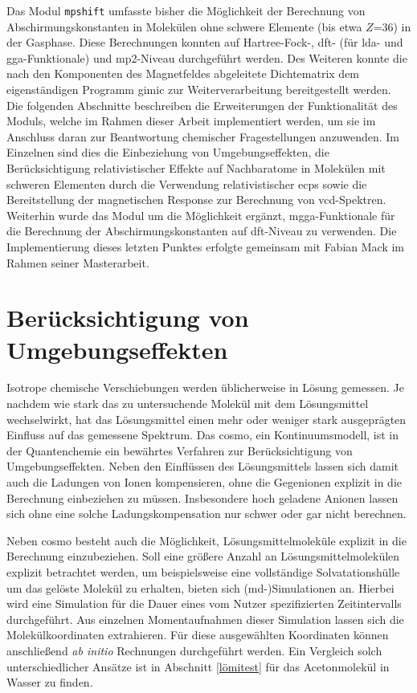 Das Modul \texttt{mpshift} umfasste bisher die Möglichkeit der Berechnung von Abschirmungskonstanten in Molekülen ohne schwere Elemente (bis etwa $Z$=36) in der Gasphase. Diese Berechnungen konnten auf Hartree-Fock-, \ac{dft}- (für \ac{lda}- und \ac{gga}-Funktionale) und \ac{mp2}-Niveau durchgeführt werden. Des Weiteren konnte die nach den Komponenten des Magnetfeldes abgeleitete Dichtematrix dem eigenständigen Programm \ac{gimic} zur Weiterverarbeitung bereitgestellt werden. Die folgenden Abschnitte beschreiben die Erweiterungen der Funktionalität des Moduls, welche im Rahmen dieser Arbeit implementiert werden, um sie im Anschluss daran zur Beantwortung chemischer Fragestellungen anzuwenden. Im Einzelnen sind dies die Einbeziehung von Umgebungseffekten, die Berücksichtigung relativistischer Effekte auf Nachbaratome in Molekülen mit schweren Elementen durch die Verwendung relativistischer \acp{ecp} sowie die Bereitstellung der magnetischen Response zur Berechnung von \ac{vcd}-Spektren. Weiterhin wurde das Modul um die Möglichkeit ergänzt, \ac{mgga}-Funktionale für die Berechnung der Abschirmungskonstanten auf \ac{dft}-Niveau zu verwenden. Die Implementierung dieses letzten Punktes erfolgte gemeinsam mit Fabian Mack im Rahmen seiner Masterarbeit.\supercite{mack2017} 


\section{Berücksichtigung von Umgebungseffekten}\label{umgebung}
Isotrope chemische Verschiebungen werden üblicherweise in Lösung gemessen. Je nachdem wie stark das zu untersuchende Molekül mit dem Lösungsmittel wechselwirkt, hat das Lösungsmittel einen mehr oder weniger stark ausgeprägten Einfluss auf das gemessene Spektrum. Das \acf{cosmo},\supercite{klamt1993cosmo} ein Kontinuumsmodell, ist in der Quantenchemie ein bewährtes Verfahren zur Berücksichtigung von Umgebungseffekten. Neben den Einflüssen des Lösungsmittels lassen sich damit auch die Ladungen von Ionen  kompensieren, ohne die Gegenionen explizit in die Berechnung einbeziehen zu müssen. Insbesondere hoch geladene Anionen lassen sich ohne eine solche Ladungskompensation nur schwer oder gar nicht berechnen. 

Neben \ac{cosmo} besteht auch die Möglichkeit, Lösungsmittelmoleküle explizit in die Berechnung einzubeziehen. Soll eine größere Anzahl an Lösungsmittelmolekülen explizit betrachtet werden, um beispielsweise eine vollständige Solvatationshülle um das gelöste Molekül zu erhalten, bieten sich \mbox{(\acs{md}-)}Simulationen an. Hierbei wird eine Simulation für die Dauer eines vom Nutzer spezifizierten Zeitintervalls durchgeführt. Aus einzelnen Momentaufnahmen dieser Simulation lassen sich die Molekülkoordinaten extrahieren. Für diese ausgewählten Koordinaten können anschließend \textit{ab initio} Rechnungen durchgeführt werden. Ein Vergleich solch unterschiedlicher Ansätze ist in Abschnitt \ref{lömitest} für das Acetonmolekül in Wasser zu finden. 

